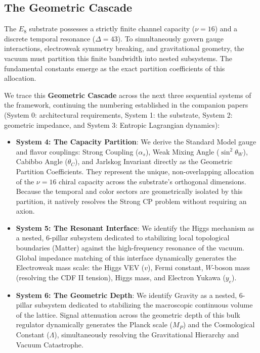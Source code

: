 \subsection{The Geometric Cascade}

The $E_8$ substrate possesses a strictly finite channel capacity ($\nu=16$) and a discrete temporal resonance 
($\Delta=43$). To simultaneously govern gauge interactions, electroweak symmetry breaking, and gravitational geometry, the vacuum must partition this finite bandwidth into nested subsystems. The fundamental constants emerge as the exact partition coefficients of this allocation.

We trace this \textbf{Geometric Cascade} across the next three sequential systems of the framework, continuing the numbering established in the companion papers (System 0: architectural requirements, System 1: the substrate, System 2: geometric impedance, and System 3: Entropic Lagrangian dynamics):

\begin{itemize}
    \item \textbf{System 4: The Capacity Partition}: 
    We derive the Standard Model gauge and flavor couplings: Strong Coupling ($\alpha_s$),  Weak Mixing Angle ($\sin^2\theta_W$), Cabibbo Angle ($\theta_C$), and Jarlskog Invariant directly as the Geometric Partition Coefficients. They represent the unique, non-overlapping allocation of the $\nu = 16$ chiral capacity across the substrate's orthogonal dimensions. Because the temporal and color sectors are geometrically isolated by this partition, it natively resolves the Strong CP problem without requiring an axion.
   
    \item \textbf{System 5: The Resonant Interface}: 
    We identify the Higgs mechanism as a nested, 6-pillar subsystem dedicated to stabilizing local topological boundaries (Matter) against the high-frequency resonance of the vacuum. Global impedance matching of this interface dynamically generates the Electroweak mass scale: the Higgs VEV ($v$), Fermi constant, $W$-boson mass (resolving the CDF II tension), Higgs mass, and Electron Yukawa ($y_e$).
   
    \item \textbf{System 6: The Geometric Depth}: 
    We identify Gravity as a nested, 6-pillar subsystem dedicated to stabilizing the macroscopic continuous volume of the lattice. Signal attenuation across the geometric depth of this bulk regulator dynamically generates the Planck scale ($M_P$) and the Cosmological Constant ($\Lambda$), simultaneously resolving the Gravitational Hierarchy and Vacuum Catastrophe.
\end{itemize}

